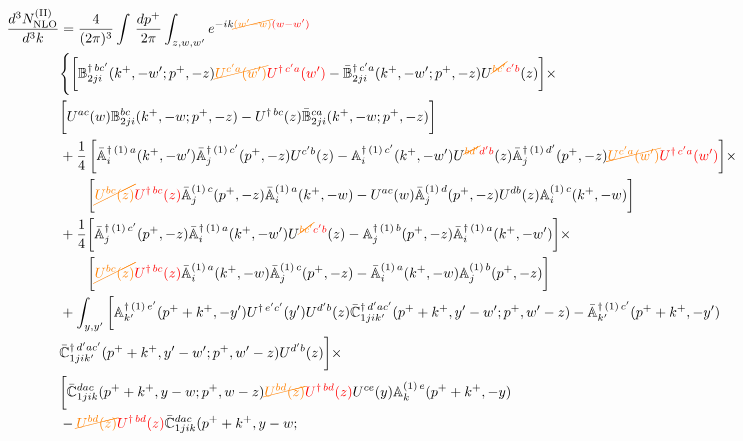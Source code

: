 \documentclass[aps,prd,amsmath,amssymb,nofootinbib]{revtex4-2}
\def\mf#1{\mathbb{#1}}
\numberwithin{equation}{section}
\begin{document}
\begin{align}\label{eq:CS2}
     \frac{d^{3}N_{\rm NLO}^{\rm (II)}}{d^{3}k} & = \frac{4}{(2\pi)^{3}} \int\, \frac{dp^{+}}{2\pi}\int_{z,w,w^{\prime}} e^{-ik{\color{orange}\cancel{(w^{\prime}-w)}}{\color{red}(w-w^{\prime})}} \notag \\ & 
    \Bigg\{\bigg[\mf{B}^{\dagger\, bc^{\prime}}_{2ji}(k^{+},-w^{\prime};p^{+},-z){\color{orange}\cancel{U^{ c^{\prime}a}(w^{\prime})}}{\color{red}U^{\dagger\, c^{\prime}a}(w^{\prime})} -\Bar{\mf{B}}^{\dagger\, c^{\prime}a}_{2ji}(k^{+},-w^{\prime}; p^{+},-z)U^{{\color{orange}\cancel{bc^{\prime}}}{\color{red}c^{\prime}b}}(z)\bigg]\times\notag \\ & \bigg[U^{ac}(w) \mf{B}^{bc}_{2ji}(k^{+},-w;p^{+},-z) -U^{\dagger\, bc}(z)\Bar{\mf{B}}^{ca}_{2ji}(k^{+},-w; p^{+},-z)\bigg]\notag \\ & + \frac{1}{4}\,\bigg[\Bar{\mf{A}}^{\dagger\, (1)\, a}_{i}(k^{+},-w^{\prime})\Bar{\mf{A}}^{\dagger\, (1)\, c^{\prime}}_{j}(p^{+},-z)U^{c^{\prime}b}(z)-\mf{A}^{\dagger\, (1)\, c^{\prime}}_{i}(k^{+},- w^{\prime})U^{{\color{orange}\cancel{bd^{\prime}}}{\color{red}d^{\prime}b}}(z)\Bar{\mf{A}}^{\dagger\, (1)\, d^{\prime}}_{j}(p^{+},-z){\color{orange}\cancel{U^{c^{\prime}a}(w^{\prime})}}{\color{red}U^{\dagger\, c^{\prime}a}(w^{\prime})}  \bigg]\times\notag \\ & \quad \quad\bigg[{\color{orange}\cancel{U^{bc}(z)}}{\color{red}U^{\dagger\, bc}(z)}\Bar{\mf{A}}^{(1)\, c}_{j}(p^{+},-z)\Bar{\mf{A}}^{(1)\, a}_{i}(k^{+},-w)-U^{ac}(w) \Bar{\mf{A}}^{(1)\, d}_{j}(p^{+},-z)U^{db}(z) \mf{A}^{(1)\, c}_{i}(k^{+},- w)\bigg] \notag \\ & +\frac{1}{4}\bigg[\Bar{\mf{A}}^{\dagger\,(1)\, c^{\prime}}_{j}(p^{+},-z)\Bar{\mf{A}}^{\dagger\, (1)\, a}_{i}(k^{+},- w^{\prime})U^{{\color{orange}\cancel{bc^{\prime}}}{\color{red}c^{\prime}b}}(z) - \mf{A}^{\dagger\, (1)\, b}_{j}(p^{+},- z)\Bar{\mf{A}}^{\dagger\, (1)\, a}_{i}(k^{+},- w^{\prime})\bigg]\times\notag \\ & \quad \quad\bigg[{\color{orange}\cancel{U^{bc}(z)}}{\color{red}U^{\dagger\, bc}(z)}\Bar{\mf{A}}^{(1)\, a}_{i}(k^{+},- w)\Bar{\mf{A}}^{(1)\, c}_{j}(p^{+},-z)-\Bar{\mf{A}}^{(1)\, a}_{i}(k^{+},- w) \mf{A}^{(1)\, b}_{j}(p^{+},- z)\bigg]\notag \\ & + \int_{y,y^{\prime}}\bigg[\mf{A}^{\dagger\, (1)\,e^{\prime}}_{k^{\prime}}(p^{+}+k^{+},-y^{\prime})U^{\dagger\, e^{\prime}c^{\prime}}(y^{\prime})U^{d^{\prime}b}(z) \Bar{\mf{C}}^{\dagger\, d^{\prime}ac^{\prime}}_{1jik^{\prime}}(p^{+}+k^{+},y^{\prime}-w^{\prime}; p^{+},w^{\prime}-z)  -\Bar{\mf{A}}^{\dagger\, (1)\,c^{\prime}}_{k^{\prime}}(p^{+}+k^{+},-y^{\prime})\notag \\ & \Bar{\mf{C}}^{\dagger\, d^{\prime}ac^{\prime}}_{1jik^{\prime}}(p^{+}+k^{+},y^{\prime}-w^{\prime}; p^{+},w^{\prime}-z)U^{d^{\prime}b}(z)\bigg]\times\notag \\ & \bigg[\Bar{\mf{C}}^{dac}_{1jik}(p^{+}+k^{+},y-w; p^{+},w-z){\color{orange}\cancel{U^{bd}(z)}}{\color{red}U^{\dagger\, bd}(z)}U^{ce}(y) \mf{A}^{(1)\,e}_{k}(p^{+}+k^{+},-y)\notag \\ & -{\color{orange}\cancel{U^{bd}(z)}}{\color{red}U^{\dagger\, bd}(z)} \Bar{\mf{C}}^{dac}_{1jik}(p^{+}+k^{+},y-w; 
\end{align}
\end{document}
